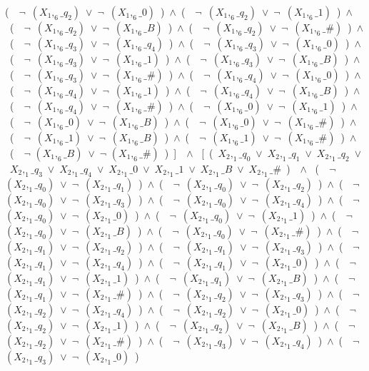 ﻿\documentclass[a4paper,10pt]{article}
\begin{document}
(\ \ $\neg$\ $(X_1,_6\_q_2)$\ $\vee$\ $\neg$\ $(X_1,_6\_0)$\ )\ $\wedge$\ (\ \ $\neg$\ $(X_1,_6\_q_2)$\ $\vee$\ $\neg$\ $(X_1,_6\_1)$\ )\ $\wedge$\ (\ \ $\neg$\ $(X_1,_6\_q_2)$\ $\vee$\ $\neg$\ $(X_1,_6\_B)$\ )\ $\wedge$\ (\ \ $\neg$\ $(X_1,_6\_q_2)$\ $\vee$\ $\neg$\ $(X_1,_6\_\#)$\ )\ $\wedge$\ (\ \ $\neg$\ $(X_1,_6\_q_3)$\ $\vee$\ $\neg$\ $(X_1,_6\_q_4)$\ )\ $\wedge$\ (\ \ $\neg$\ $(X_1,_6\_q_3)$\ $\vee$\ $\neg$\ $(X_1,_6\_0)$\ )\ $\wedge$\ (\ \ $\neg$\ $(X_1,_6\_q_3)$\ $\vee$\ $\neg$\ $(X_1,_6\_1)$\ )\ $\wedge$\ (\ \ $\neg$\ $(X_1,_6\_q_3)$\ $\vee$\ $\neg$\ $(X_1,_6\_B)$\ )\ $\wedge$\ (\ \ $\neg$\ $(X_1,_6\_q_3)$\ $\vee$\ $\neg$\ $(X_1,_6\_\#)$\ )\ $\wedge$\ (\ \ $\neg$\ $(X_1,_6\_q_4)$\ $\vee$\ $\neg$\ $(X_1,_6\_0)$\ )\ $\wedge$\ (\ \ $\neg$\ $(X_1,_6\_q_4)$\ $\vee$\ $\neg$\ $(X_1,_6\_1)$\ )\ $\wedge$\ (\ \ $\neg$\ $(X_1,_6\_q_4)$\ $\vee$\ $\neg$\ $(X_1,_6\_B)$\ )\ $\wedge$\ (\ \ $\neg$\ $(X_1,_6\_q_4)$\ $\vee$\ $\neg$\ $(X_1,_6\_\#)$\ )\ $\wedge$\ (\ \ $\neg$\ $(X_1,_6\_0)$\ $\vee$\ $\neg$\ $(X_1,_6\_1)$\ )\ $\wedge$\ (\ \ $\neg$\ $(X_1,_6\_0)$\ $\vee$\ $\neg$\ $(X_1,_6\_B)$\ )\ $\wedge$\ (\ \ $\neg$\ $(X_1,_6\_0)$\ $\vee$\ $\neg$\ $(X_1,_6\_\#)$\ )\ $\wedge$\ (\ \ $\neg$\ $(X_1,_6\_1)$\ $\vee$\ $\neg$\ $(X_1,_6\_B)$\ )\ $\wedge$\ (\ \ $\neg$\ $(X_1,_6\_1)$\ $\vee$\ $\neg$\ $(X_1,_6\_\#)$\ )\ $\wedge$\ (\ \ $\neg$ $(X_1,_6\_B)$\ $\vee$\ $\neg$ $(X_1,_6\_\#)$\ )\ ]\ \ $\wedge$ \ [\ (\ $X_2,_1\_q_0$\ $\vee$\ $X_2,_1\_q_1$\ $\vee$\ $X_2,_1\_q_2$\ $\vee$\ $X_2,_1\_q_3$\ $\vee$\ $X_2,_1\_q_4$\ $\vee$\ $X_2,_1\_0$\ $\vee$\ $X_2,_1\_1$\ $\vee$\ $X_2,_1\_B$\ $\vee$\ $X_2,_1\_\#$\ )\ \ $\wedge$ \ (\ \ $\neg$\ $(X_2,_1\_q_0)$\ $\vee$\ $\neg$\ $(X_2,_1\_q_1)$\ )\ $\wedge$\ (\ \ $\neg$\ $(X_2,_1\_q_0)$\ $\vee$\ $\neg$\ $(X_2,_1\_q_2)$\ )\ $\wedge$\ (\ \ $\neg$\ $(X_2,_1\_q_0)$\ $\vee$\ $\neg$\ $(X_2,_1\_q_3)$\ )\ $\wedge$\ (\ \ $\neg$\ $(X_2,_1\_q_0)$\ $\vee$\ $\neg$\ $(X_2,_1\_q_4)$\ )\ $\wedge$\ (\ \ $\neg$\ $(X_2,_1\_q_0)$\ $\vee$\ $\neg$\ $(X_2,_1\_0)$\ )\ $\wedge$\ (\ \ $\neg$\ $(X_2,_1\_q_0)$\ $\vee$\ $\neg$\ $(X_2,_1\_1)$\ )\ $\wedge$\ (\ \ $\neg$\ $(X_2,_1\_q_0)$\ $\vee$\ $\neg$\ $(X_2,_1\_B)$\ )\ $\wedge$\ (\ \ $\neg$\ $(X_2,_1\_q_0)$\ $\vee$\ $\neg$\ $(X_2,_1\_\#)$\ )\ $\wedge$\ (\ \ $\neg$\ $(X_2,_1\_q_1)$\ $\vee$\ $\neg$\ $(X_2,_1\_q_2)$\ )\ $\wedge$\ (\ \ $\neg$\ $(X_2,_1\_q_1)$\ $\vee$\ $\neg$\ $(X_2,_1\_q_3)$\ )\ $\wedge$\ (\ \ $\neg$\ $(X_2,_1\_q_1)$\ $\vee$\ $\neg$\ $(X_2,_1\_q_4)$\ )\ $\wedge$\ (\ \ $\neg$\ $(X_2,_1\_q_1)$\ $\vee$\ $\neg$\ $(X_2,_1\_0)$\ )\ $\wedge$\ (\ \ $\neg$\ $(X_2,_1\_q_1)$\ $\vee$\ $\neg$\ $(X_2,_1\_1)$\ )\ $\wedge$\ (\ \ $\neg$\ $(X_2,_1\_q_1)$\ $\vee$\ $\neg$\ $(X_2,_1\_B)$\ )\ $\wedge$\ (\ \ $\neg$\ $(X_2,_1\_q_1)$\ $\vee$\ $\neg$\ $(X_2,_1\_\#)$\ )\ $\wedge$\ (\ \ $\neg$\ $(X_2,_1\_q_2)$\ $\vee$\ $\neg$\ $(X_2,_1\_q_3)$\ )\ $\wedge$\ (\ \ $\neg$\ $(X_2,_1\_q_2)$\ $\vee$\ $\neg$\ $(X_2,_1\_q_4)$\ )\ $\wedge$\ (\ \ $\neg$\ $(X_2,_1\_q_2)$\ $\vee$\ $\neg$\ $(X_2,_1\_0)$\ )\ $\wedge$\ (\ \ $\neg$\ $(X_2,_1\_q_2)$\ $\vee$\ $\neg$\ $(X_2,_1\_1)$\ )\ $\wedge$\ (\ \ $\neg$\ $(X_2,_1\_q_2)$\ $\vee$\ $\neg$\ $(X_2,_1\_B)$\ )\ $\wedge$\ (\ \ $\neg$\ $(X_2,_1\_q_2)$\ $\vee$\ $\neg$\ $(X_2,_1\_\#)$\ )\ $\wedge$\ (\ \ $\neg$\ $(X_2,_1\_q_3)$\ $\vee$\ $\neg$\ $(X_2,_1\_q_4)$\ )\ $\wedge$\ (\ \ $\neg$\ $(X_2,_1\_q_3)$\ $\vee$\ $\neg$\ $(X_2,_1\_0)$\ )\ 
\end{document}

